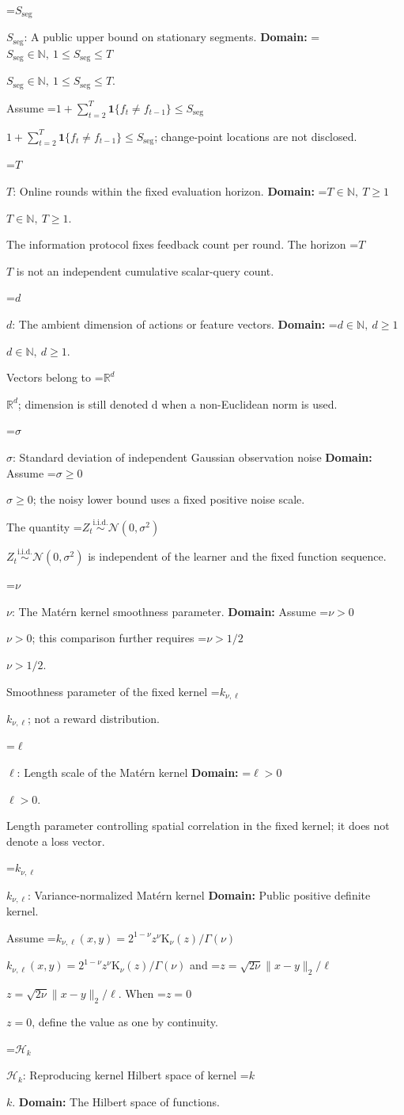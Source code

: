 \documentclass[10pt,a4paper]{article}
\newcommand{\AtlasMath}[1]{\par\begingroup\centering\setbox0=\hbox{$\displaystyle #1$}\ifdim\wd0>1.4\linewidth\typeout{ATLAS WIDE FORMULA: \the\wd0}\fi\ifdim\wd0>\linewidth\resizebox{\linewidth}{!}{\box0}\else\box0\fi\par\endgroup}
\newcommand{\AtlasInlineMath}[1]{\begingroup\setbox0=\hbox{$#1$}\ifdim\wd0>.4\linewidth\endgroup\AtlasMath{#1}\else\endgroup$#1$\fi}
\begin{document}
\AtlasInlineMath{S_{\mathrm{seg}}}: A public upper bound on stationary segments. \textbf{Domain:} \AtlasInlineMath{S_{\mathrm{seg}}\in\mathbb N,\ 1\le S_{\mathrm{seg}}\le T}.

Assume \AtlasInlineMath{1+\sum_{t=2}^T\mathbf1\{f_t\ne f_{t-1}\}\le S_{\mathrm{seg}}}; change-point locations are not disclosed.

\AtlasInlineMath{T}: Online rounds within the fixed evaluation horizon. \textbf{Domain:} \AtlasInlineMath{T\in\mathbb N,\ T\ge1}.

The information protocol fixes feedback count per round. The horizon \AtlasInlineMath{T} is not an independent cumulative scalar-query count.

\AtlasInlineMath{d}: The ambient dimension of actions or feature vectors. \textbf{Domain:} \AtlasInlineMath{d\in\mathbb N,\ d\ge1}.

Vectors belong to \AtlasInlineMath{\mathbb R^d}; dimension is still denoted d when a non-Euclidean norm is used.

\AtlasInlineMath{\sigma}: Standard deviation of independent Gaussian observation noise \textbf{Domain:} Assume \AtlasInlineMath{\sigma\ge0}; the noisy lower bound uses a fixed positive noise scale.

The quantity \AtlasInlineMath{Z_t\overset{\mathrm{i.i.d.}}\sim\mathcal N(0,\sigma^2)} is independent of the learner and the fixed function sequence.

\AtlasInlineMath{\nu}: The Matérn kernel smoothness parameter. \textbf{Domain:} Assume \AtlasInlineMath{\nu>0}; this comparison further requires \AtlasInlineMath{\nu>1/2}.

Smoothness parameter of the fixed kernel \AtlasInlineMath{k_{\nu,\ell}}; not a reward distribution.

\AtlasInlineMath{\ell}: Length scale of the Matérn kernel \textbf{Domain:} \AtlasInlineMath{\ell>0}.

Length parameter controlling spatial correlation in the fixed kernel; it does not denote a loss vector.

\AtlasInlineMath{k_{\nu,\ell}}: Variance-normalized Matérn kernel \textbf{Domain:} Public positive definite kernel.

Assume \AtlasInlineMath{k_{\nu,\ell}(x,y)=2^{1-\nu}z^\nu\mathrm K_\nu(z)/\Gamma(\nu)} and \AtlasInlineMath{z=\sqrt{2\nu}\|x-y\|_2/\ell}. When \AtlasInlineMath{z=0}, define the value as one by continuity.

\AtlasInlineMath{\mathcal H_k}: Reproducing kernel Hilbert space of kernel \AtlasInlineMath{k}. \textbf{Domain:} The Hilbert space of functions.
\end{document}
